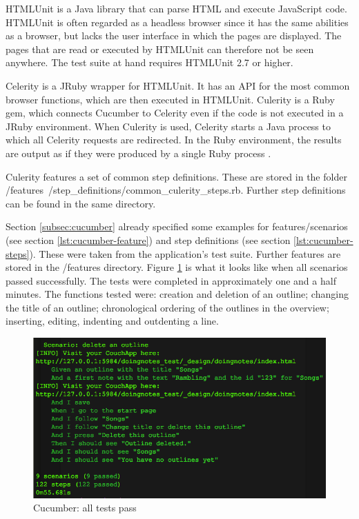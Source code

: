 HTMLUnit is a Java library that can parse HTML and execute JavaScript code. HTMLUnit is often regarded as a headless browser \cite{culerity:introduction} since it has the same abilities as a browser, but lacks the user interface in which the pages are displayed. The pages that are read or executed by HTMLUnit can therefore not be seen anywhere. The test suite at hand requires HTMLUnit 2.7 or higher.

Celerity is a JRuby wrapper for HTMLUnit. It has an API for the most common browser functions, which are then executed in HTMLUnit. Culerity is a Ruby gem, which connects Cucumber to Celerity even if the code is not executed in a JRuby environment. When Culerity is used, Celerity starts a Java process to which all Celerity requests are redirected. In the Ruby environment, the results are output as if they were produced by a single Ruby process \cite{culerity:introduction}.

Culerity features a set of common step definitions. These are stored in the folder {\selectfont /features\ /step\_definitions/common\_culerity\_steps.rb}. Further step definitions can be found in the same directory.

Section \ref{subsec:cucumber} already specified some examples for features/scenarios (see section \ref{lst:cucumber-feature}) and step definitions (see section \ref{lst:cucumber-steps}). These were taken from the application's test suite. Further features are stored in the {\selectfont /features} directory. Figure \ref{fig:cucumber-good} is what it looks like when all scenarios passed successfully. The tests were completed in approximately one and a half minutes. The functions tested were: creation and deletion of an outline; changing the title of an outline; chronological ordering of the outlines in the overview; inserting, editing, indenting and outdenting a line.


\medskip
\begin{figure}[ht] 
  \begin{center}
    \includegraphics[width=\textwidth]{grafik/cucumber-example-good} 
  \end{center}
  \caption{Cucumber: all tests pass}
  \label{fig:cucumber-good} 
\end{figure}

